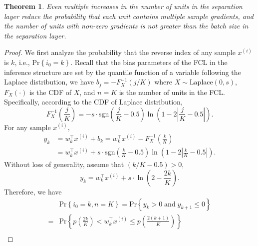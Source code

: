 \documentclass[lettersize,journal]{IEEEtran}
\newtheorem{theorem}{Theorem}
\begin{document}
\begin{theorem}
Even multiple increases in the number of units in the separation layer reduce the probability that each unit contains multiple sample gradients, and the number of units with non-zero gradients is not greater than the batch size in the separation layer.
\label{theorem-two-performance-related}
\end{theorem}

\begin{proof}
We first analyze the probability that the reverse index of any sample $x^{\left(i\right)}$ is $k$, i.e., $\mathrm{Pr}\left\{i_0 = k\right\}$. Recall that the bias parameters of the FCL in the inference structure are set by the quantile function of a variable following the Laplace distribution, we have $b_j = - F^{-1}_X( j / K)$ where $X \sim \textrm{Laplace}(0,s)$, $F_X(\cdot)$ is the CDF of $X$, and $n=K$ is the number of units in the FCL. Specifically, according to the CDF of Laplace distribution, 
\begin{equation}
    F_X^{-1}\left( \frac{j}{K} \right) = - s \cdot \mathrm{sgn}\left( \frac{j}{K} - 0.5 \right) \ln \left(1 - 2 \left| \frac{j}{K} -0.5 \right| \right).
\end{equation}
For any sample $x^{\left(i\right)}$,
\begin{align}
    y_{k} & = w_{k}^\intercal x^{\left(i\right)} + b_{k} = w_{k}^\intercal x^{\left(i\right)} - F_X^{-1}\left( \frac{k}{K} \right) \nonumber \\
    & = w_{k}^\intercal x^{\left(i\right)} + s \cdot \mathrm{sgn}\left( \frac{k}{K} - 0.5 \right) \ln \left(1 - 2 \left| \frac{k}{K} -0.5 \right| \right).
\end{align}
Without loss of generality, assume that $\left(k/K - 0.5\right) > 0$,
\begin{equation}
    y_{k} = w_{k}^\intercal x^{\left(i\right)} + s \cdot \ln \left(2 - \frac{2k}{K} \right).
\end{equation}
Therefore, we have
\begin{align}
    & \mathrm{Pr} \left\{i_0 = k, n=K\right\} =  \mathrm{Pr} \left\{ y_k > 0 \; \mathrm{and} \; y_{k+1} \leq 0 \right\} \nonumber \\
    = & \mathrm{Pr} \left\{ p\left( \frac{2k}{K} \right) <  w_{k}^\intercal x^{\left(i\right)} \leq  p\left( \frac{2\left( k+1\right)}{K} \right) \right\} \nonumber \\

\end{align}
\end{proof}
\end{document}
